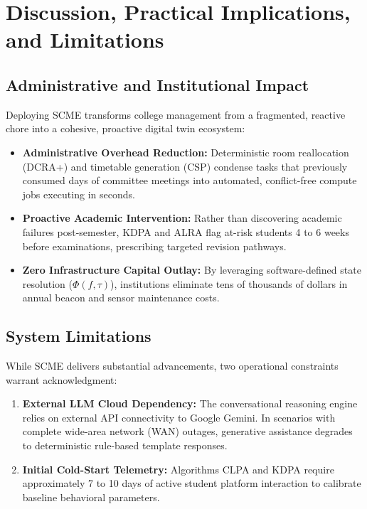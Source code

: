 \documentclass[11pt,a4paper]{article}
\begin{document}
\section{Discussion, Practical Implications, and Limitations}
\label{sec:discussion}

\subsection{Administrative and Institutional Impact}
Deploying SCME transforms college management from a fragmented, reactive chore into a cohesive, proactive digital twin ecosystem:
\begin{itemize}
    \item \textbf{Administrative Overhead Reduction:} Deterministic room reallocation (DCRA+) and timetable generation (CSP) condense tasks that previously consumed days of committee meetings into automated, conflict-free compute jobs executing in seconds.
    \item \textbf{Proactive Academic Intervention:} Rather than discovering academic failures post-semester, KDPA and ALRA flag at-risk students 4 to 6 weeks before examinations, prescribing targeted revision pathways.
    \item \textbf{Zero Infrastructure Capital Outlay:} By leveraging software-defined state resolution ($\Phi(f, \tau)$), institutions eliminate tens of thousands of dollars in annual beacon and sensor maintenance costs.
\end{itemize}

\subsection{System Limitations}
While SCME delivers substantial advancements, two operational constraints warrant acknowledgment:
\begin{enumerate}
    \item \textbf{External LLM Cloud Dependency:} The conversational reasoning engine relies on external API connectivity to Google Gemini. In scenarios with complete wide-area network (WAN) outages, generative assistance degrades to deterministic rule-based template responses.
    \item \textbf{Initial Cold-Start Telemetry:} Algorithms CLPA and KDPA require approximately 7 to 10 days of active student platform interaction to calibrate baseline behavioral parameters.
\end{enumerate}
\end{document}
